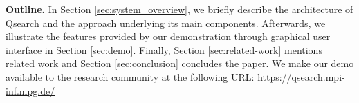 


\noindent \textbf{Outline.}
In Section \ref{sec:system_overview}, we briefly describe the architecture of Qsearch and the approach underlying its main components. Afterwards, we illustrate the features provided by our demonstration through graphical user interface in Section \ref{sec:demo}. Finally, Section \ref{sec:related-work} mentions related work and Section \ref{sec:conclusion} concludes the paper. We make our demo available to the research community at the following URL: \textcolor{blue}{\url{https://qsearch.mpi-inf.mpg.de/}}


